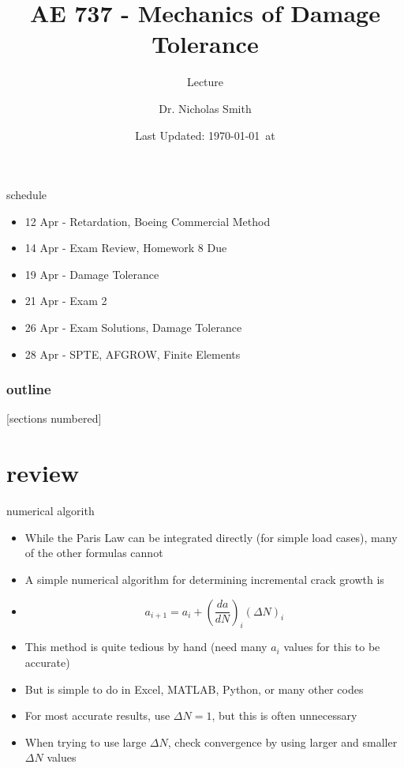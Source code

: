 \documentclass[10pt]{beamer}
\title{AE 737 - Mechanics of Damage Tolerance}
\subtitle{Lecture \arabic{lecture}}
\date{Last Updated: \today\ at \DTMcurrenttime}
\author{Dr. Nicholas Smith}
\institute{Wichita State University, Department of Aerospace Engineering}
\begin{document}
\maketitle
\begin{frame}{schedule}
	\begin{itemize}
		\item 12 Apr - Retardation, Boeing Commercial Method
		\item 14 Apr - Exam Review, Homework 8 Due
		\item 19 Apr - Damage Tolerance
		\item 21 Apr - Exam 2
		\item 26 Apr - Exam Solutions, Damage Tolerance
		\item 28 Apr - SPTE, AFGROW, Finite Elements
	\end{itemize}
\end{frame}

\begin{frame}
  \frametitle{outline}
  [sections numbered]
  \tableofcontents[hideallsubsections]
\end{frame}

\section{review}

\begin{frame}{numerical algorith}
	\begin{itemize}[<+->]
		\item While the Paris Law can be integrated directly (for simple load cases), many of the other formulas cannot
		\item A simple numerical algorithm for determining incremental crack growth is
		\item[]	\begin{equation}
		a_{i+1} = a_i + \left(\frac{da}{dN}\right)_i\left(\Delta N\right)_i
		\end{equation}
		\item This method is quite tedious by hand (need many $a_i$ values for this to be accurate) 
		\item But is simple to do in Excel, MATLAB, Python, or many other codes
		\item For most accurate results, use $\Delta N = 1$, but this is often unnecessary
		\item When trying to use large $\Delta N$, check convergence by using larger and smaller $\Delta N$ values
	\end{itemize}
\end{frame}
\end{document}
